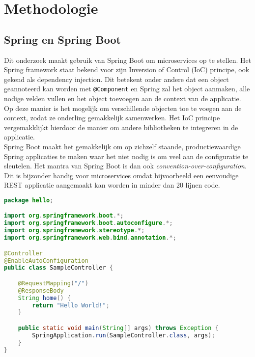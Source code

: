 
\chapter{Methodologie}
\label{ch:methodologie}



\section{Spring en Spring Boot}
\label{sec:spring-boot}

Dit onderzoek maakt gebruik van Spring Boot om microservices op te stellen. Het Spring framework staat bekend voor zijn Inversion of Control (IoC) principe, ook gekend als dependency injection. Dit betekent onder andere dat een object geannoteerd kan worden met \texttt{@Component} en Spring zal het object aanmaken, alle nodige velden vullen en het object toevoegen aan de context van de applicatie. Op deze manier is het mogelijk om verschillende objecten toe te voegen aan de context, zodat ze onderling gemakkelijk samenwerken. Het IoC principe vergemakklijkt hierdoor de manier om andere bibliotheken te integreren in de applicatie. \\

Spring Boot maakt het gemakkelijk om op zichzelf staande, productiewaardige Spring applicaties te maken waar het niet nodig is om veel aan de configuratie te sleutelen. Het mantra van Spring Boot is dan ook \textit{convention-over-configuration}. Dit is bijzonder handig voor microservices omdat bijvoorbeeld een eenvoudige REST applicatie aangemaakt kan worden in minder dan 20 lijnen code. \\

\begin{lstlisting}[language=Java, caption=eenvoudige Spring Boot REST app]
package hello;

import org.springframework.boot.*;
import org.springframework.boot.autoconfigure.*;
import org.springframework.stereotype.*;
import org.springframework.web.bind.annotation.*;

@Controller
@EnableAutoConfiguration
public class SampleController {

    @RequestMapping("/")
    @ResponseBody
    String home() {
        return "Hello World!";
    }

    public static void main(String[] args) throws Exception {
        SpringApplication.run(SampleController.class, args);
    }
}
\end{lstlisting}

